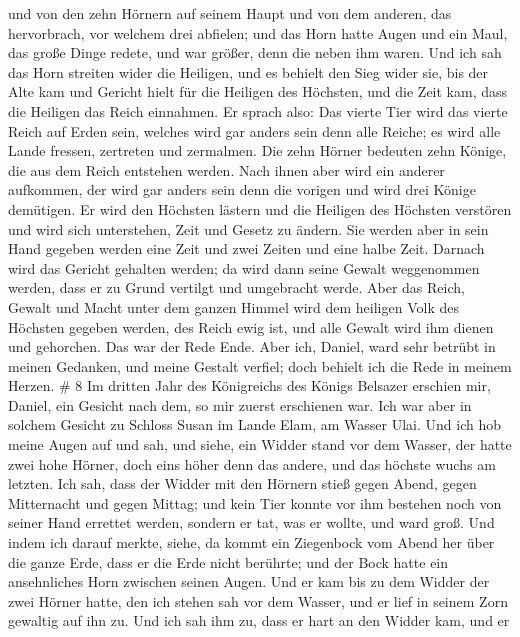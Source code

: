  und von den zehn Hörnern auf seinem Haupt und von dem
anderen, das hervorbrach, vor welchem drei abfielen; und das Horn hatte
Augen und ein Maul, das große Dinge redete, und war größer, denn die
neben ihm waren.  Und ich sah das Horn streiten wider die
Heiligen, und es behielt den Sieg wider sie,  bis der Alte
kam und Gericht hielt für die Heiligen des Höchsten, und die Zeit kam,
dass die Heiligen das Reich einnahmen.  Er sprach also: Das
vierte Tier wird das vierte Reich auf Erden sein, welches wird gar
anders sein denn alle Reiche; es wird alle Lande fressen, zertreten und
zermalmen.  Die zehn Hörner bedeuten zehn Könige, die aus
dem Reich entstehen werden. Nach ihnen aber wird ein anderer aufkommen,
der wird gar anders sein denn die vorigen und wird drei Könige
demütigen.  Er wird den Höchsten lästern und die Heiligen
des Höchsten verstören und wird sich unterstehen, Zeit und Gesetz zu
ändern. Sie werden aber in sein Hand gegeben werden eine Zeit und zwei
Zeiten und eine halbe Zeit.  Darnach wird das Gericht
gehalten werden; da wird dann seine Gewalt weggenommen werden, dass er
zu Grund vertilgt und umgebracht werde.  Aber das Reich,
Gewalt und Macht unter dem ganzen Himmel wird dem heiligen Volk des
Höchsten gegeben werden, des Reich ewig ist, und alle Gewalt wird ihm
dienen und gehorchen.  Das war der Rede Ende. Aber ich,
Daniel, ward sehr betrübt in meinen Gedanken, und meine Gestalt verfiel;
doch behielt ich die Rede in meinem Herzen. \# 8  Im dritten
Jahr des Königreichs des Königs Belsazer erschien mir, Daniel, ein
Gesicht nach dem, so mir zuerst erschienen war.  Ich war
aber in solchem Gesicht zu Schloss Susan im Lande Elam, am Wasser Ulai.
 Und ich hob meine Augen auf und sah, und siehe, ein Widder
stand vor dem Wasser, der hatte zwei hohe Hörner, doch eins höher denn
das andere, und das höchste wuchs am letzten.  Ich sah, dass
der Widder mit den Hörnern stieß gegen Abend, gegen Mitternacht und
gegen Mittag; und kein Tier konnte vor ihm bestehen noch von seiner Hand
errettet werden, sondern er tat, was er wollte, und ward groß.
 Und indem ich darauf merkte, siehe, da kommt ein Ziegenbock
vom Abend her über die ganze Erde, dass er die Erde nicht berührte; und
der Bock hatte ein ansehnliches Horn zwischen seinen Augen. 
Und er kam bis zu dem Widder der zwei Hörner hatte, den ich stehen sah
vor dem Wasser, und er lief in seinem Zorn gewaltig auf ihn zu.
 Und ich sah ihm zu, dass er hart an den Widder kam, und er
